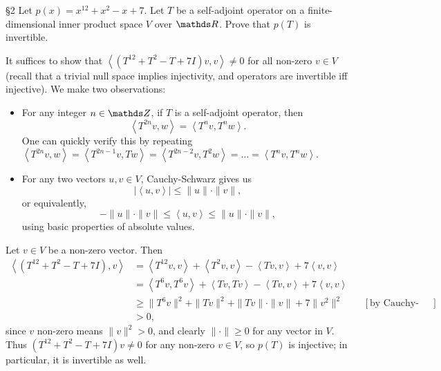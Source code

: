 \documentclass{homework}
\begin{document}
\begin{problem}{\S 2}
  Let $p(x)=x^{12}+x^2-x+7$. Let $T$ be a self-adjoint operator on a finite-dimensional inner
  product space $V$ over $\R$. Prove that $p(T)$ is invertible.
\end{problem}
\begin{solution}
  It suffices to show that $\left<(T^{12}+T^2-T+7I)v,v \right>\neq 0 $ for all non-zero $v\in V$
  (recall that a trivial null space implies injectivity, and operators are invertible iff
  injective). We make two observations:
  \begin{itemize}
    \item For any integer $n\in \Z$, if $T$ is a self-adjoint operator, then \[
        \left<T^{2n}v,w \right> =\left<T^{n}v,T^{n}w \right> 
      .\] One can quickly verify this by repeating $\left<T^{2n}v,w \right> =\left<T^{2n-1}v,Tw
      \right> =\left<T^{2n-2}v,T^2w \right> =\ldots=\left<T^{n}v,T^{n}w \right> $.
    \item For any two vectors $u,v\in V$, Cauchy-Schwarz gives us \[
      \left| \left<u,v \right> \right| \le \|u\|\cdot \|v\|
    ,\] or equivalently, \[
      -\|u\|\cdot \|v\|\le \left<u,v \right> \le \|u\|\cdot \|v\|
    ,\] using basic properties of absolute values.
  \end{itemize}

  Let $v\in V$ be a non-zero vector. Then
  \begin{align*}
    \left<\left( T^{12}+T^2-T+7I \right),v  \right> &= \left<T^{12}v,v \right> +\left<T^2v,v
    \right> -\left<Tv,v \right> +7\left<v,v \right>  \\
                                                    &= \left<T^6v,T^6v \right>+\left<Tv,Tv \right>
    -\left<Tv,v \right> +7\left<v,v \right>   \\
                                                    &\ge \|T^6v\|^2+\|Tv\|^2+\|Tv\|\cdot
    \|v\|+7\|v^2\|^2&&[\text{by Cauchy-Schwarz; see observation}]\\
    &>0
  ,\end{align*} since $v$ non-zero means $\|v\|^2>0$, and clearly $\|\cdot \|\ge 0$ for any vector
  in $V$. Thus $(T^{12}+T^2-T+7I)v\neq 0$ for any non-zero $v\in V$, so $p(T)$ is injective; in
  particular, it is invertible as well.
\end{solution}
\end{document}
